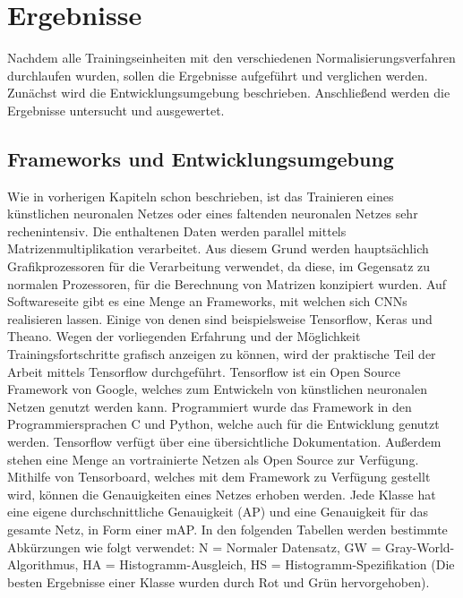 \chapter{Ergebnisse}\label{s.ergebnisse}
Nachdem alle Trainingseinheiten mit den verschiedenen Normalisierungsverfahren durchlaufen wurden, sollen die Ergebnisse aufgeführt und verglichen werden. Zunächst wird die Entwicklungsumgebung beschrieben. Anschließend werden die Ergebnisse untersucht und ausgewertet. 
\section{Frameworks und Entwicklungsumgebung}\label{s.entwicklung}
Wie in vorherigen Kapiteln schon beschrieben, ist das Trainieren eines künstlichen neuronalen Netzes oder eines faltenden neuronalen Netzes sehr rechenintensiv. Die enthaltenen Daten werden parallel mittels Matrizenmultiplikation verarbeitet. Aus diesem Grund werden hauptsächlich Grafikprozessoren für die Verarbeitung verwendet, da diese, im Gegensatz zu normalen Prozessoren, für die Berechnung von Matrizen konzipiert wurden. Auf Softwareseite gibt es eine Menge an Frameworks, mit welchen sich CNNs realisieren lassen. Einige von denen sind beispielsweise Tensorflow, Keras und Theano. Wegen der vorliegenden Erfahrung und der Möglichkeit Trainingsfortschritte grafisch anzeigen zu können, wird der praktische Teil der Arbeit mittels Tensorflow durchgeführt. Tensorflow ist ein Open Source Framework von Google, welches zum Entwickeln von künstlichen neuronalen Netzen genutzt werden kann. Programmiert wurde das Framework in den Programmiersprachen C und Python, welche auch für die Entwicklung genutzt werden. Tensorflow verfügt über eine übersichtliche Dokumentation. Außerdem stehen eine Menge an vortrainierte Netzen als Open Source zur Verfügung. Mithilfe von Tensorboard, welches mit dem Framework zu Verfügung gestellt wird, können die Genauigkeiten eines Netzes erhoben werden. Jede Klasse hat eine eigene durchschnittliche Genauigkeit (AP) und eine Genauigkeit für das gesamte Netz, in Form einer mAP. In den folgenden Tabellen werden bestimmte Abkürzungen wie folgt verwendet: N = Normaler Datensatz, GW = Gray-World-Algorithmus, HA = Histogramm-Ausgleich, HS = Histogramm-Spezifikation (Die besten Ergebnisse einer Klasse wurden durch Rot und Grün hervorgehoben).  
